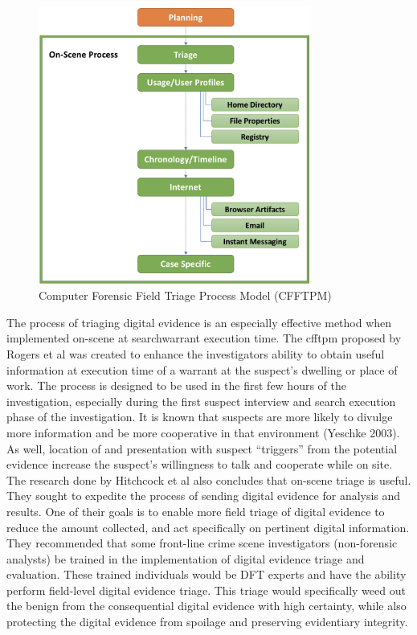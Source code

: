 \documentclass[12pt]{article}
\begin{document}
\begin{figure}[ht]
  \centering
    \includegraphics[width=0.8\textwidth]{images/CFFTPM.png}
  \caption{Computer Forensic Field Triage Process Model (CFFTPM)}
  \label{fig:CFFTPM}
\end{figure}

The process of triaging digital evidence is an especially effective method
when implemented on-scene at \gls{searchwarrant} execution time.  The \gls{cfftpm}  proposed
by Rogers et al\cite{rogers2006computer} was created to enhance the investigators
ability to obtain useful information at execution time of a warrant at the
suspect's dwelling or place of work.  The process is designed to be used in the first
few hours of the investigation, especially during the first suspect interview and
search execution phase of the investigation.  It is known that suspects are more
likely to divulge more information and be more cooperative in that environment
(Yeschke 2003\cite{yeschke2003art}).  As well, location of and presentation with
suspect ``triggers'' from the potential evidence increase the suspect's willingness
to talk and cooperate while on site\cite{rogers2006computer}.\\

The research done by Hitchcock et al\cite{hitchcock2016tiered} also
concludes that on-scene triage is useful.  They sought to expedite the process of
sending digital evidence for analysis and results.  One of their goals is to enable
more field triage of digital evidence to reduce the amount collected, and act
specifically on pertinent digital information.  They recommended that some
front-line crime scene investigators (non-forensic analysts) be trained in the
implementation of digital evidence triage and evaluation.  These trained individuals
would be DFT experts and have the ability perform field-level
digital evidence triage.  This triage would specifically weed out the benign from
the consequential digital evidence with high certainty, while also protecting the
digital evidence from spoilage and preserving evidentiary integrity.\\
\end{document}
